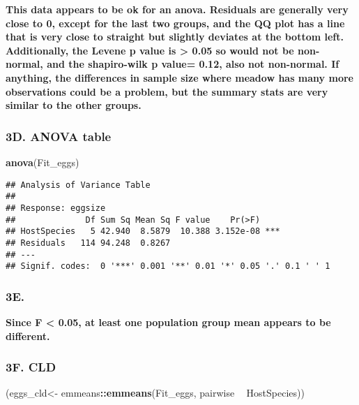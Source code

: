 \documentclass[]{article}
\newenvironment{Shaded}{\begin{snugshade}}{\end{snugshade}}
\newcommand{\KeywordTok}[1]{\textcolor[rgb]{0.13,0.29,0.53}{\textbf{#1}}}
\newcommand{\NormalTok}[1]{#1}
\newcommand{\OperatorTok}[1]{\textcolor[rgb]{0.81,0.36,0.00}{\textbf{#1}}}
\newcommand{\StringTok}[1]{\textcolor[rgb]{0.31,0.60,0.02}{#1}}
\begin{document}
\textbf{This data appears to be ok for an anova. Residuals are generally
very close to 0, except for the last two groups, and the QQ plot has a
line that is very close to straight but slightly deviates at the bottom
left. Additionally, the Levene p value is \textgreater{} 0.05 so would
not be non-normal, and the shapiro-wilk p value= 0.12, also not
non-normal. If anything, the differences in sample size where meadow has
many more observations could be a problem, but the summary stats are
very similar to the other groups.}

\hypertarget{d.-anova-table}{%
\subsubsection{3D. ANOVA table}\label{d.-anova-table}}

\begin{Shaded}
\begin{Highlighting}[]
\KeywordTok{anova}\NormalTok{(Fit_eggs)}
\end{Highlighting}
\end{Shaded}

\begin{verbatim}
## Analysis of Variance Table
## 
## Response: eggsize
##              Df Sum Sq Mean Sq F value    Pr(>F)    
## HostSpecies   5 42.940  8.5879  10.388 3.152e-08 ***
## Residuals   114 94.248  0.8267                      
## ---
## Signif. codes:  0 '***' 0.001 '**' 0.01 '*' 0.05 '.' 0.1 ' ' 1
\end{verbatim}

\hypertarget{e.}{%
\subsubsection{3E.}\label{e.}}

\textbf{Since F \textless{} 0.05, at least one population group mean
appears to be different.}

\hypertarget{f.-cld}{%
\subsubsection{3F. CLD}\label{f.-cld}}

\begin{Shaded}
\begin{Highlighting}[]
\NormalTok{(eggs_cld<-}\StringTok{ }\NormalTok{emmeans}\OperatorTok{::}\KeywordTok{emmeans}\NormalTok{(Fit_eggs, pairwise }\OperatorTok{~}\StringTok{ }\NormalTok{HostSpecies))}
\end{Highlighting}
\end{Shaded}
\end{document}
